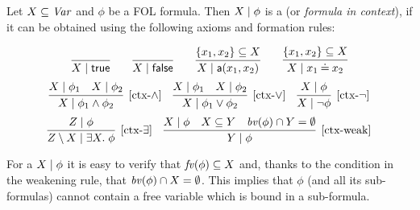\begin{definition}
	\label{def:formula in context}
	Let $X \subseteq \mathit{Var}$ and $\phi$ be a FOL formula. Then ${X} \mid {\phi}$ is a \emph{\cfor} (or  \emph{formula in context}),  if it can be obtained using the following axioms and formation rules:
	
	$$\infer{\ctx{X}{\True}}{} \qquad 
	\infer{\ctx{X}{\False}}{} \qquad 
	\infer{\ctx{X}{\la(x_1,x_2)}}{\{x_1, x_2\}\subseteq X} \qquad 
	\infer{\ctx{X}{x_1\Eq x_2}}{\{x_1, x_2\}\subseteq X}$$
	$$\infer[{[\mbox{ctx-}\wedge]}]{\ctx{X}{\phi_1 \wedge \phi_2}}{\ctx{X}{\phi_1} & \ctx{X}{\phi_2}} \quad 
	\infer[{[\mbox{ctx-}\vee]}]{\ctx{X}{\phi_1 \vee \phi_2}}{\ctx{X}{\phi_1} & \ctx{X}{\phi_2}} \quad 
	\infer[{[\mbox{ctx-}\neg]}]{\ctx{X}{\neg \phi}}{\ctx{X}{\phi}}$$
	$$\infer[{[\mbox{ctx-}\exists]}]{\ctx{Z \setminus X}{\exists X \st\phi}}{\ctx{Z}{\phi}} \quad 
\infer[{[\mbox{ctx-weak}]}]{\ctx{Y}{\phi}}{\ctx{X}{\phi} & X\subseteq Y & \bv(\phi)\cap Y = \emptyset}$$
\end{definition}
%
For a {\cfor} ${X} \mid {\phi}$ it is easy to verify that $\mathit{fv}(\phi) \subseteq X$ and, thanks to the condition in the weakening rule, that $\mathit{bv}(\phi) \cap X = \emptyset$. This implies that $\phi$ (and all its sub-formulas) cannot contain a free variable which is bound in a sub-formula. 

